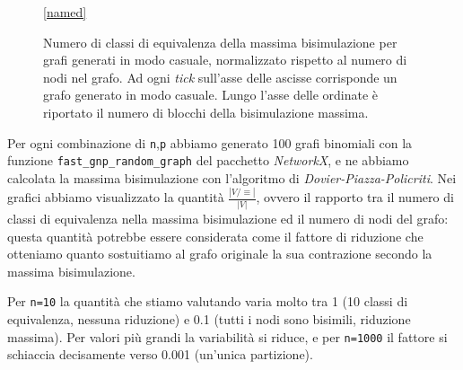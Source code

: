 \begin{figure}[H]
\begin{center}
\begin{subfigure}[b]{0.3\textwidth}
        \end{subfigure}
        \ref*{named}
    \end{center}
    \caption{Numero di classi di equivalenza della massima bisimulazione per grafi generati in modo casuale, normalizzato rispetto al numero di nodi nel grafo. Ad ogni \emph{tick} sull'asse delle ascisse corrisponde un grafo generato in modo casuale. Lungo l'asse delle ordinate è riportato il numero di blocchi della bisimulazione massima.}
    \label{fig:bisi_size}
\end{figure}

Per ogni combinazione di \verb|n|,\verb|p| abbiamo generato 100 grafi binomiali con la funzione \verb|fast_gnp_random_graph| del pacchetto \emph{NetworkX}, e ne abbiamo calcolata la massima bisimulazione con l'algoritmo di \emph{Dovier-Piazza-Policriti}. Nei grafici abbiamo visualizzato la quantità $\frac{|V / \equiv|}{|V|}$, ovvero il rapporto tra il numero di classi di equivalenza nella massima bisimulazione ed il numero di nodi del grafo: questa quantità potrebbe essere considerata come il fattore di riduzione che otteniamo quanto sostuitiamo al grafo originale la sua contrazione secondo la massima bisimulazione.

Per \verb|n=10| la quantità che stiamo valutando varia molto tra 1 (10 classi di equivalenza, nessuna riduzione) e 0.1 (tutti i nodi sono bisimili, riduzione massima). Per valori più grandi la variabilità si riduce, e per \verb|n=1000| il fattore si schiaccia decisamente verso 0.001 (un'unica partizione).
